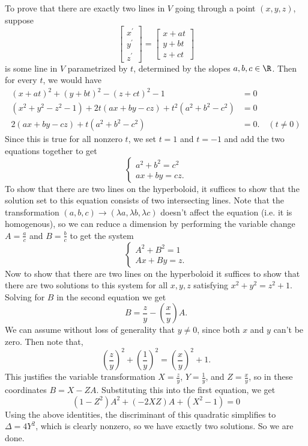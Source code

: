 \documentclass[11pt,letterpaper]{article}
\begin{document}
\begin{changemargin}{1em}{1em}
  To prove that there are exactly two lines in $V$ going through a point $(x,y,z)$, suppose 
  \[
    \begin{bmatrix}
      x^\prime \\y^\prime \\z^\prime 
    \end{bmatrix} = 
    \begin{bmatrix}
      x+at\\ y+bt\\ z+ct
    \end{bmatrix}
  \]
  is some line in $V$ parametrized by $t$, determined by the slopes $a,b,c\in \R$. Then for every $t$, we would have 
  \[
    \begin{aligned}
      (x+at)^2 + (y+bt)^2 - (z+ct)^2 - 1&= 0\\
      (x^2 + y^2 - z^2 - 1) + 2t(ax+by-cz) + t^2(a^2 + b^2 - c^2) &= 0\\
      2(ax+by-cz) + t(a^2 + b^2 - c^2) &= 0. \quad (t\neq 0)
    \end{aligned}
  \]
  Since this is true for all nonzero $t$, we set $t=1$ and $t=-1$ and add the two equations together to get
  \[
    \begin{cases}
      a^2 + b^2 = c^2\\
      ax+by=cz.
    \end{cases}
  \]  
  To show that there are two lines on the hyperboloid, it suffices to show that the solution set to this equation consists of two intersecting lines. Note that the transformation $(a,b,c)\to (\lambda a, \lambda b, \lambda c)$ doesn't affect the equation (i.e. it is homogenous), so we can reduce a dimension by performing the variable change $A=\frac{a}{c}$ and $B=\frac{b}{c}$ to get the system 
  \[
    \begin{cases}
      A^2+B^2=1\\
      Ax+By=z.
    \end{cases}
  \] 
  Now to show that there are two lines on the hyperboloid it suffices to show that there are two solutions to this system for all $x,y,z$ satisfying $x^2+y^2=z^2+1$. Solving for $B$ in the second equation we get
  \[
    B=\frac{z}{y}-\left(\frac{x}{y}\right)A
  .\]
  We can assume without loss of generality that $y\neq 0$, since both $x$ and $y$ can't be zero. Then note that,   
  \[
    \left(\frac{z}{y}\right)^2+\left(\frac{1}{y}\right)^2=\left(\frac{x}{y}\right)^2+1
  .\]       
  This justifies the variable transformation $X=\frac{z}{y}$, $Y=\frac{1}{y}$, and $Z=\frac{x}{y}$, so in these coordinates $B=X-ZA$. Substituting this into the first equation, we get 
  \[
    (1-Z^2)A^2+(-2XZ)A+(X^2-1)=0
  \]
  Using the above identities, the discriminant of this quadratic simplifies to $\Delta = 4Y^2$, which is clearly nonzero, so we have exactly two solutions. So we are done.
\end{changemargin}
\end{document}
